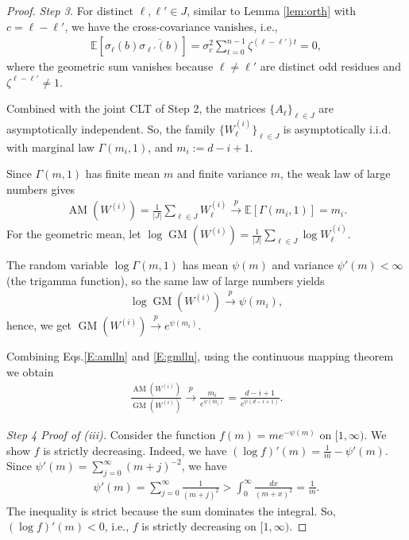 \documentclass[11pt,a4paper]{article}
\theoremstyle{plain}
\theoremstyle{definition}
\theoremstyle{remark}
\newcommand{\E}{\mathbb{E}}
\begin{document}
\begin{proof}
\medskip
\textit{Step 3.} For distinct $\ell,\ell'\in J$, similar to Lemma \ref{lem:orth} with $c=\ell-\ell'$, we have the cross-covariance vanishes, i.e., 
\begin{align}
\E[\sigma_\ell(b)\overline{\sigma_{\ell'}(b)}]=\sigma_c^2\sum_{t=0}^{n-1}\zeta^{(\ell-\ell')t}=0,
\label{E:covva}
\end{align}
where the geometric sum vanishes because $\ell\ne\ell'$ are distinct odd residues and $\zeta^{\ell-\ell'}\ne1$. 

Combined with the joint CLT of Step 2, the matrices $\{A_\ell\}_{\ell\in J}$ are asymptotically independent. So, the family $\{W^{(i)}_\ell\}_{\ell\in J}$ is asymptotically i.i.d. with marginal law $\Gamma(m_i,1)$, and $m_i:=d-i+1$.

Since $\Gamma(m,1)$ has finite mean $m$ and finite variance $m$, the weak law of large numbers gives
\begin{align}
  \operatorname{AM}(W^{(i)})=\frac{1}{|J|}\sum_{\ell\in J}W^{(i)}_\ell \xrightarrow{p}\E[\Gamma(m_i,1)]=m_i.
  \label{E:amlln}
\end{align}
For the geometric mean, let $\log\operatorname{GM}(W^{(i)})=\frac{1}{|J|}\sum_{\ell\in J}\log W^{(i)}_\ell$.

The random variable $\log\Gamma(m,1)$ has mean $\psi(m)$ and variance $\psi'(m)<\infty$ (the trigamma function), so the same law of large numbers yields
\begin{align}
  \log\operatorname{GM}(W^{(i)})\xrightarrow{p}\psi(m_i),
    \label{E:gmlln}
\end{align}
hence, we get $\operatorname{GM}(W^{(i)})\xrightarrow{p}e^{\psi(m_i)}$. 

Combining Eqs.\eqref{E:amlln} and \eqref{E:gmlln}, using the continuous mapping theorem we obtain
\begin{align}
  \frac{\operatorname{AM}(W^{(i)})}{\operatorname{GM}(W^{(i)})}
  \xrightarrow{p}\frac{m_i}{e^{\psi(m_i)}}
  =\frac{d-i+1}{e^{\psi(d-i+1)}}.
  \label{E:ratiolim}
\end{align}

\medskip
\textit{Step 4 Proof of (iii).} Consider the function $f(m)=m e^{-\psi(m)}$ on $[1,\infty)$. We show $f$ is strictly decreasing. Indeed, we have $(\log f)'(m)=\tfrac{1}{m}-\psi'(m)$. Since $\psi'(m)=\sum_{j=0}^{\infty}(m+j)^{-2}$, we have
\begin{align}
  \psi'(m)=\sum_{j=0}^{\infty}\frac{1}{(m+j)^2}>\int_0^{\infty}\frac{dx}{(m+x)^2}=\frac{1}{m}.
  \label{E:psiineq}
\end{align}
The inequality is strict because the sum dominates the integral. So, $(\log f)'(m)<0$, i.e., $f$ is strictly decreasing on $[1,\infty)$.


\end{proof}
\end{document}
